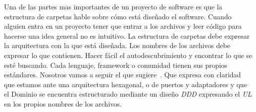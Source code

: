 Una de las partes mas importantes de un proyecto de software es que la estructura de carpetas hable sobre cómo está diseñado el software. Cuando alguien entra en un proyecto tener que entrar a los archivos y leer código para hacerse una idea general no es intuitivo. La estructura de carpetas debe expresar la arquitectura con la que está diseñada. Los nombres de los archivos debe expresar lo que contienen. Hacer fácil el autodescubrimiento y encontrar lo que se esté buscando. Cada lenguaje, framework o comunidad tienen sus propios estándares. Nosotros vamos a seguir el que sugiere~\cite{TomHombergs2019GYHD}. Que expresa con claridad que estamos ante una arquitectura hexagonal, o de puertos y adaptadores y que el Dominio se encuentra estructurado mediante un diseño \textit{DDD} expresando el \textit{UL} en los propios nombres de los archivos.



